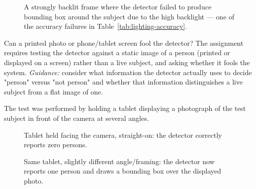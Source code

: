 \begin{figure}[H]
\centering
\caption{A strongly backlit frame where the detector failed to produce bounding box around the subject due to the high backlight — one of the accuracy failures in Table~\ref{tab:lighting-accuracy}.}\label{fig:back-light-miss}
\end{figure}


\begin{questionsection}{Can a printed photo or phone/tablet screen fool the detector?}
The assignment requires testing the detector against a static image of a
person (printed or displayed on a screen) rather than a live subject, and
asking whether it fools the system. \textit{Guidance:} consider what
information the detector actually uses to decide "person" versus
"not person" and whether that information distinguishes a live subject
from a flat image of one.
\end{questionsection}

The test was performed by holding a tablet displaying a photograph of the
test subject in front of the camera at several angles.

\begin{figure}[H]
\centering
\caption{Tablet held facing the camera, straight-on: the detector correctly reports zero persons.}\label{fig:spoof-miss}
\end{figure}

\begin{figure}[H]
\centering
\caption{Same tablet, slightly different angle/framing: the detector now reports one person and draws a bounding box over the displayed photo.}\label{fig:spoof-hit}
\end{figure}

